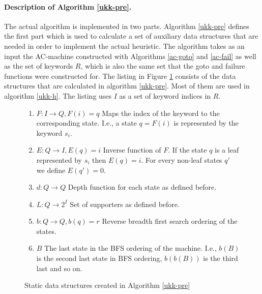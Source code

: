 \documentclass[english,twoside,censored,csm,algorithms-track-2020]{HYthesisML}
\theoremstyle{plain}
\theoremstyle{definition}
\numberwithin{testexample}{chapter}
\begin{document}
\paragraph{Description of Algorithm \ref{ukk-pre}.}
The actual algorithm is implemented in two parts. Algorithm \ref{ukk-pre} defines the first part
which is used to calculate a set of auxiliary data structures that are needed in order to implement
the actual heuristic. The algorithm takes as an input the AC-machine constructed with
Algorithms \ref{ac-goto} and \ref{ac-fail} as well as the set of keywords $R$, which is also
the same set that the goto and failure functions were constructed for. 
The listing in Figure \ref{lst-auxiliary-data} consists of the data structures that are calculated
in algorithm \ref{ukk-pre}. Most of them are used in algorithm \ref{ukk-h}. The listing uses $I$ as
a set of keyword indices in $R$.

\begin{figure}[hb]
\begin{enumerate}
  \item $F : I \rightarrow Q, F(i)=q$ Maps the index of the keyword to the corresponding state. I.e., a state $q=F(i)$ is represented by the keyword $s_i$.
  \item $E : Q \rightarrow I, E(q)=i$ Inverse function of $F$. If the state $q$ is a leaf represented by $s_i$ then $E(q)=i$. For every non-leaf states $q'$ we define $E(q')=0$.
  \item $d : Q \rightarrow Q$ Depth function for each state as defined before.
  \item $L : Q \rightarrow 2^{I}$ Set of supporters as defined before.
  \item $b : Q \rightarrow Q, b(q)=r$ Reverse breadth first search ordering of the states.
  \item $B$ The last state in the BFS ordering of the machine. I.e., $b(B)$ is the second last state in BFS ordering, $b(b(B))$ is the third last and so on.
\end{enumerate}
\caption{Static data structures created in Algorithm \ref{ukk-pre}} \label{lst-auxiliary-data}
\end{figure}
\end{document}
